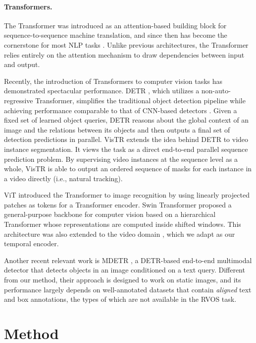 \documentclass[10pt,twocolumn,letterpaper]{article}
\renewcommand{\cite}[1]{\citep{#1}}
\begin{document}
\paragraph{Transformers.} 
The Transformer \cite{vaswani2017attention} was introduced as an attention-based building block for sequence-to-sequence machine translation, and since then has become the cornerstone for most NLP tasks \cite{Devlin2019BERTPO, yang2019xlnet,radford2019language,brown2020gpt3}. Unlike previous architectures, the Transformer relies entirely on the attention mechanism to draw dependencies between input and output. 

Recently, the introduction of Transformers to computer vision tasks has demonstrated spectacular performance. DETR \cite{carion2020detr}, which utilizes a non-auto-regressive Transformer, simplifies the traditional object detection pipeline while achieving performance comparable to that of CNN-based detectors \cite{faster_rcnn_NIPS_2017}. Given a fixed set of learned object queries, DETR reasons about the global context of an image and the relations between its objects and then outputs a final set of detection predictions in parallel.
VisTR \cite{wang2021vistr} extends the idea behind DETR to video instance segmentation. It views the task as a direct end-to-end parallel sequence prediction problem. By supervising video instances at the sequence level as a whole, VisTR is able to output an ordered sequence of masks for each instance in a video  directly (i.e., natural tracking).

ViT \cite{ViT_2021} introduced the Transformer to image recognition by using linearly projected patches as tokens for a Transformer encoder. Swin Transformer \cite{liu2021swin} proposed a general-purpose backbone for computer vision based on a hierarchical Transformer whose representations are computed inside shifted windows. This architecture was also extended to the video domain \cite{liu2021vswin}, which we adapt as our temporal encoder. 

Another recent relevant work is MDETR \cite{kamath2021mdetr}, a DETR-based end-to-end multimodal detector that detects objects in an image conditioned on a text query. Different from our method, their approach is designed to work on static images, and its performance largely depends on well-annotated datasets that contain \textit{aligned} text and box annotations, the types of which are not available in the RVOS task.
 \section{Method}
\label{sec:method}
\end{document}

